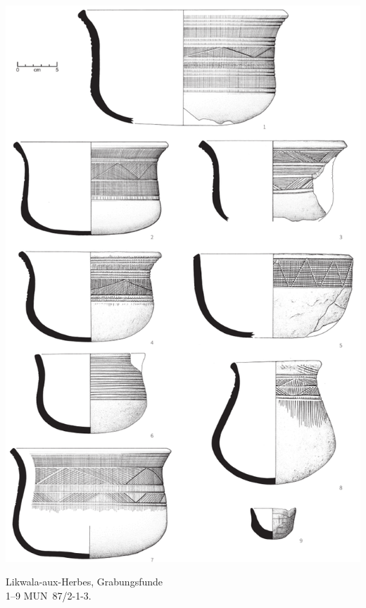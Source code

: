 \begin{pl}[H]
	\includegraphics{plt/Taf92.pdf}
	\vspace{.75em}\caption{Likwala-aux-Herbes, Grabungsfunde \\ 1--9 MUN~87/2-1-3.}
	\label{pl:92}
\end{pl}

